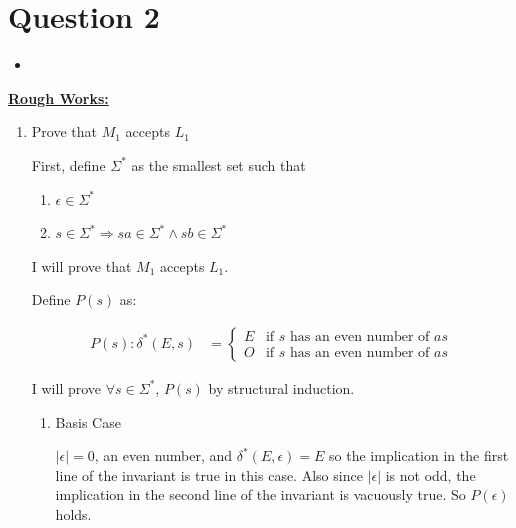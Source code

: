 \documentclass[12pt]{article}
\begin{document}
\bigskip

\section*{Question 2}

\bigskip

\begin{itemize}
    \item

\end{itemize}

\bigskip

\underline{\textbf{Rough Works:}}

\bigskip

\begin{enumerate}[1.]
    \item Prove that $M_1$ accepts $L_1$

    \begin{mdframed}
    First, define $\Sigma^*$ as the smallest set such that
    \begin{enumerate}
        \item $\epsilon \in \Sigma^*$
        \item $s \in \Sigma^* \Rightarrow sa \in \Sigma^* \land sb \in \Sigma^*$
    \end{enumerate}

    \bigskip

    I will prove that $M_1$ accepts $L_1$.

    \bigskip

    Define $P(s)$ as:

    \begin{align}
        P(s):\delta^*(E,s) &= \begin{cases}
            E & \text{if $s$ has an even number of $as$}\\
            O & \text{if $s$ has an even number of $as$}
        \end{cases}
    \end{align}

    I will prove $\forall s \in \Sigma^*$, $P(s)$ by structural induction.

    \begin{enumerate}[1.]
        \item Basis Case

        \bigskip

        $\vert \epsilon \vert = 0$, an even number, and $\delta^*(E,\epsilon) = E$
        so the implication in the first line of the invariant is true in this case.
        Also since $\vert \epsilon \vert$ is not odd, the implication in the second
        line of the invariant is vacuously true. So $P(\epsilon)$ holds.


\end{enumerate}
\end{mdframed}
\end{enumerate}
\end{document}
